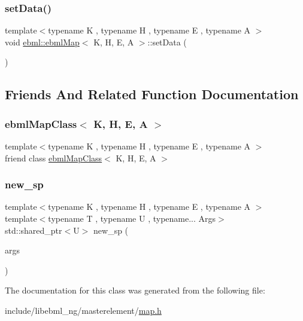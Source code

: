 \subsubsection{\texorpdfstring{set\+Data()}{setData()}\hspace{0.1cm}{\footnotesize\ttfamily [11/11]}}
{\footnotesize\ttfamily template$<$typename K , typename H , typename E , typename A $>$ \\
void \mbox{\hyperlink{classebml_1_1ebmlMap}{ebml\+::ebml\+Map}}$<$ K, H, E, A $>$\+::set\+Data (\begin{DoxyParamCaption}\item[{std\+::unordered\+\_\+map$<$ K, \mbox{\hyperlink{namespaceebml_adad533b7705a16bb360fe56380c5e7be}{ebml\+Element\+\_\+sp}}, H, E, A $>$ \&\&}]{ }\end{DoxyParamCaption})}



\subsection{Friends And Related Function Documentation}
\mbox{\label{classebml_1_1ebmlMap_a07a0de0d7e69f365ddabb5fbb0089698}} 
\subsubsection{\texorpdfstring{ebml\+Map\+Class$<$ K, H, E, A $>$}{ebmlMapClass< K, H, E, A >}}
{\footnotesize\ttfamily template$<$typename K , typename H , typename E , typename A $>$ \\
friend class \mbox{\hyperlink{classebml_1_1ebmlMapClass}{ebml\+Map\+Class}}$<$ K, H, E, A $>$\hspace{0.3cm}{\ttfamily [friend]}}

\mbox{\label{classebml_1_1ebmlMap_ace404b6adc012cac5ccd9c03160456e3}} 
\subsubsection{\texorpdfstring{new\+\_\+sp}{new\_sp}}
{\footnotesize\ttfamily template$<$typename K , typename H , typename E , typename A $>$ \\
template$<$typename T , typename U , typename... Args$>$ \\
std\+::shared\+\_\+ptr$<$U$>$ new\+\_\+sp (\begin{DoxyParamCaption}\item[{Args...}]{args }\end{DoxyParamCaption})\hspace{0.3cm}{\ttfamily [friend]}}



The documentation for this class was generated from the following file\+:\begin{DoxyCompactItemize}
\item 
include/libebml\+\_\+ng/masterelement/\mbox{\hyperlink{map_8h}{map.\+h}}\end{DoxyCompactItemize}
